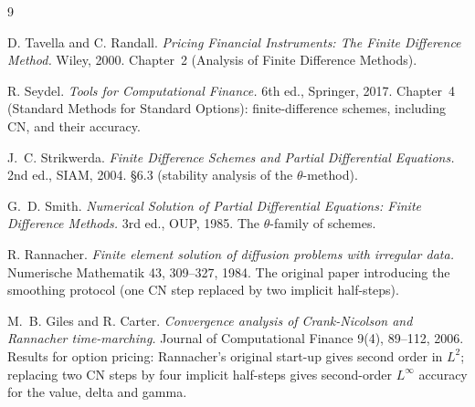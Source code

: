 \documentclass[11pt,a4paper]{article}
\begin{document}
\begin{thebibliography}{9}

D. Tavella and C. Randall.
\emph{Pricing Financial Instruments: The Finite Difference Method.}
Wiley, 2000. Chapter~2 (Analysis of Finite Difference Methods).

R. Seydel.
\emph{Tools for Computational Finance.}
6th ed., Springer, 2017. Chapter~4 (Standard Methods for Standard
Options): finite-difference schemes, including CN, and their accuracy.

J.~C. Strikwerda.
\emph{Finite Difference Schemes and Partial Differential Equations.}
2nd ed., SIAM, 2004. \S6.3 (stability analysis of the $\theta$-method).

G.~D. Smith.
\emph{Numerical Solution of Partial Differential Equations:
Finite Difference Methods.}
3rd ed., OUP, 1985. The $\theta$-family of schemes.

R. Rannacher.
\emph{Finite element solution of diffusion problems with irregular data.}
Numerische Mathematik 43, 309--327, 1984. The original paper
introducing the smoothing protocol (one CN step replaced by two
implicit half-steps).

M.~B. Giles and R. Carter.
\emph{Convergence analysis of Crank-Nicolson and Rannacher
time-marching.}
Journal of Computational Finance 9(4), 89--112, 2006. Results for
option pricing: Rannacher's original start-up gives second order in
$L^2$; replacing two CN steps by four implicit half-steps gives
second-order $L^\infty$ accuracy for the value, delta and gamma.

\end{thebibliography}
\end{document}
